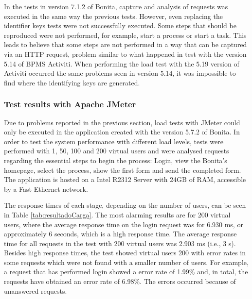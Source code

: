 \documentclass[runningheads,a4paper]{llncs}
\begin{document}
In the tests in version 7.1.2 of Bonita, capture and analysis of requests was executed in the same way the previous tests. However, even replacing the identifier keys tests were not successfully executed. Some steps that should be reproduced were not performed, for example, start a process or start a task. This leads to believe that some steps are not performed in a way that can be captured via an HTTP request, problem similar to what happened in test with the version 5.14 of BPMS Activiti. When performing the load test with the 5.19 version of Activiti occurred the same problems seen in version 5.14, it was impossible to find where the identifying keys are generated.

\subsubsection{Test results with Apache JMeter}

Due to problems reported in the previous section, load tests with JMeter could only be executed in the application created with the version 5.7.2 of Bonita. In order to test the system performance with different load levels, tests were performed with 1, 50, 100 and 200 virtual users and were analysed requests regarding the essential steps to begin the process: Login, view the Bonita's homepage, select the process, show the first form and send the completed form. The application is hosted on a Intel R2312 Server with 24GB of RAM, accessible by a Fast Ethernet network.


The response times of each stage, depending on the number of users, can be seen in Table \ref{tab:resultadoCarga}. The most alarming results are for 200 virtual users, where the average response time on the login request was for 6.930 ms, or approximately 6 seconds, which is a high response time. The average response time for all requests in the test with 200 virtual users was 2.903 ms (i.e., 3 s). Besides high response times, the test showed virtual users 200 with error rates in some requests which were not found with a smaller number of users. For example, a request that has performed login showed a error rate of 1.99\% and, in total, the requests have obtained an error rate of 6.98\%. The errors occurred because of unanswered requests.
\end{document}
